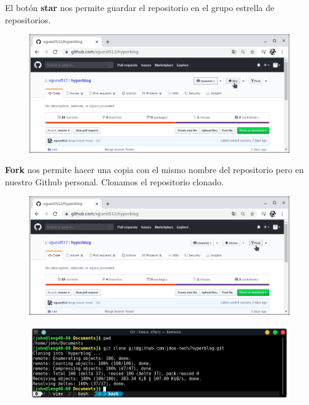\documentclass{article}
\begin{document}
\newpage

El botón \textbf{star} nos permite guardar el repositorio en el grupo estrella
de repositorios.

\begin{figure}[h!]
  \centering
  \includegraphics[scale=0.75]{./Pictures/307_star.png}
\end{figure}

\textbf{Fork} nos permite hacer una copia con el mismo nombre del repositorio
pero en nuestro Github personal. Clonamos el repositorio clonado.

\begin{figure}[h!]
  \centering
  \includegraphics[scale=0.75]{./Pictures/308_fork.png}
\end{figure}

\begin{figure}[h!]
  \centering
  \includegraphics[scale=0.75]{./Pictures/310_clone.png}
\end{figure}
\end{document}
